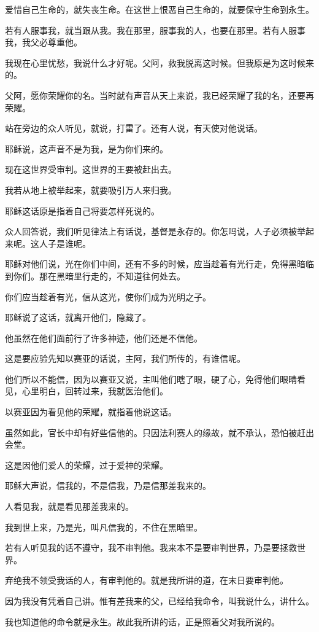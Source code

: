 \documentclass[12pt,oneside]{book}
\begin{document}
爱惜自己生命的，就失丧生命。在这世上恨恶自己生命的，就要保守生命到永生。

若有人服事我，就当跟从我。我在那里，服事我的人，也要在那里。若有人服事我，我父必尊重他。

我现在心里忧愁，我说什么才好呢。父阿，救我脱离这时候。但我原是为这时候来的。

父阿，愿你荣耀你的名。当时就有声音从天上来说，我已经荣耀了我的名，还要再荣耀。

站在旁边的众人听见，就说，打雷了。还有人说，有天使对他说话。

耶稣说，这声音不是为我，是为你们来的。

现在这世界受审判。这世界的王要被赶出去。

我若从地上被举起来，就要吸引万人来归我。

耶稣这话原是指着自己将要怎样死说的。

众人回答说，我们听见律法上有话说，基督是永存的。你怎吗说，人子必须被举起来呢。这人子是谁呢。

耶稣对他们说，光在你们中间，还有不多的时候，应当趁着有光行走，免得黑暗临到你们。那在黑暗里行走的，不知道往何处去。

你们应当趁着有光，信从这光，使你们成为光明之子。

耶稣说了这话，就离开他们，隐藏了。

他虽然在他们面前行了许多神迹，他们还是不信他。

这是要应验先知以赛亚的话说，主阿，我们所传的，有谁信呢。

他们所以不能信，因为以赛亚又说，主叫他们瞎了眼，硬了心，免得他们眼睛看见，心里明白，回转过来，我就医治他们。

以赛亚因为看见他的荣耀，就指着他说这话。

虽然如此，官长中却有好些信他的。只因法利赛人的缘故，就不承认，恐怕被赶出会堂。

这是因他们爱人的荣耀，过于爱神的荣耀。

耶稣大声说，信我的，不是信我，乃是信那差我来的。

人看见我，就是看见那差我来的。

我到世上来，乃是光，叫凡信我的，不住在黑暗里。

若有人听见我的话不遵守，我不审判他。我来本不是要审判世界，乃是要拯救世界。

弃绝我不领受我话的人，有审判他的。就是我所讲的道，在末日要审判他。

因为我没有凭着自己讲。惟有差我来的父，已经给我命令，叫我说什么，讲什么。

我也知道他的命令就是永生。故此我所讲的话，正是照着父对我所说的。
\end{document}

